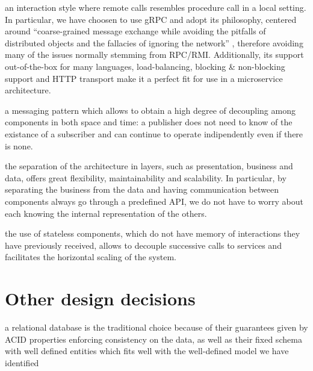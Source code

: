 \begin{description}[leftmargin=0pt]
    \item[RPC:] an interaction style where remote calls resembles procedure call in a local setting. In particular, we have
          choosen to use gRPC and adopt its philosophy, centered around ``coarse-grained message exchange while avoiding the
          pitfalls of distributed objects and the fallacies of ignoring the network'' \cite{gRPCPrinciples}, therefore
          avoiding many of the issues normally stemming from RPC/RMI. Additionally, its support out-of-the-box for many
          languages, load-balancing, blocking \& non-blocking support and HTTP transport make it a perfect fit for use in a
          microservice architecture.
    \item[Pub-sub/Message queueing:] a messaging pattern which allows to obtain a high degree of decoupling among components
          in both space and time: a publisher does not need to know of the existance of a subscriber and can continue to
          operate indipendently even if there is none.
    \item[Tiered architecture:] the separation of the architecture in layers, such as presentation, business and data,
          offers great flexibility, maintainability and scalability. In particular, by separating the business from the data
          and having communication between components always go through a predefined API, we do not have to worry about
          each knowing the internal representation of the others.
    \item[Stateless components:] the use of stateless components, which do not have memory of interactions they have previously
          received, allows to decouple successive calls to services and facilitates the horizontal scaling of the system.
\end{description}

\section{Other design decisions}
\begin{description}[leftmargin=0pt]
    \item[Relational DBMS:]
          a relational database is the traditional choice because of their guarantees given by ACID properties
          enforcing consistency on the data, as well as their fixed schema with well defined entities which fits
          well with the well-defined model we have identified
\end{description}
